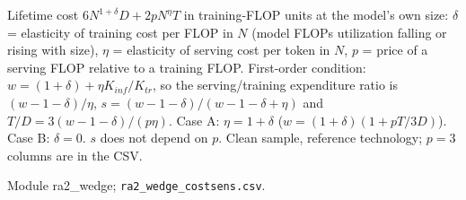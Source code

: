\begin{table}[tp]
\centering
\caption{Sensitivity of the Revealed Serving Share to the Cost Side}
\label{tab:ra2-costsens}
\footnotesize
\setlength{\tabcolsep}{4pt}
\ifdefined\ratabbox\else\newsavebox{\ratabbox}\fi
{}
\ifdim\wd\ratabbox>\textwidth\resizebox{\textwidth}{!}{\usebox{\ratabbox}}\else\usebox{\ratabbox}\fi\par
\begin{tablenotes}Lifetime cost $6N^{1+\delta}D+2pN^{\eta}T$ in training-FLOP units at the model's own size: $\delta$ = elasticity of training cost per FLOP in $N$ (model FLOPs utilization falling or rising with size), $\eta$ = elasticity of serving cost per token in $N$, $p$ = price of a serving FLOP relative to a training FLOP. First-order condition: $w=(1+\delta)+\eta K_{inf}/K_{tr}$, so the serving/training expenditure ratio is $(w-1-\delta)/\eta$, $s=(w-1-\delta)/(w-1-\delta+\eta)$ and $T/D=3(w-1-\delta)/(p\eta)$. Case A: $\eta=1+\delta$ ($w=(1+\delta)(1+pT/3D)$). Case B: $\delta=0$. $s$ does not depend on $p$. Clean sample, reference technology; $p=3$ columns are in the CSV.\end{tablenotes}
\begin{tablenotes}[Source]Module ra2\_wedge; \texttt{ra2\_wedge\_costsens.csv}.\end{tablenotes}
\end{table}
